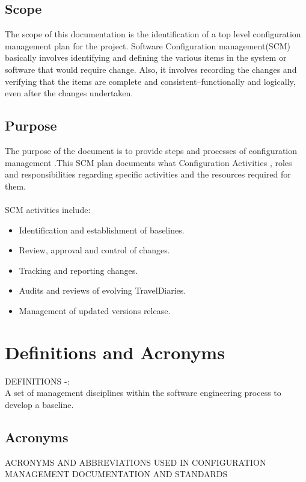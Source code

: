 \documentclass[]{article}
\begin{document}
\subsection{Scope}
The scope of this documentation is the identification of a top ­level configuration management plan for the project. Software Configuration management(SCM) basically involves identifying and defining the various items in the system or software that would require change. Also, it involves recording the changes and verifying that the items are complete and consistent–functionally and logically, even after the changes undertaken.


\subsection{Purpose}
The purpose of the document is to provide steps and processes of configuration management .This SCM plan documents what Configuration Activities , roles and responsibilities regarding specific activities and the resources required for them.\\\\
SCM activities include​:
\begin{itemize}

\item Identification and establishment of baselines.
\item Review, approval and control of changes.
\item Tracking and reporting changes.
\item Audits and reviews of evolving TravelDiaries.
\item Management of updated versions release.

\end{itemize}

\section{Definitions and Acronyms}

DEFINITIONS -:\\

A set of management disciplines within the software engineering process
to develop a baseline.


\subsection{Acronyms}
ACRONYMS AND ABBREVIATIONS USED IN CONFIGURATION
MANAGEMENT DOCUMENTATION AND STANDARDS
\end{document}
